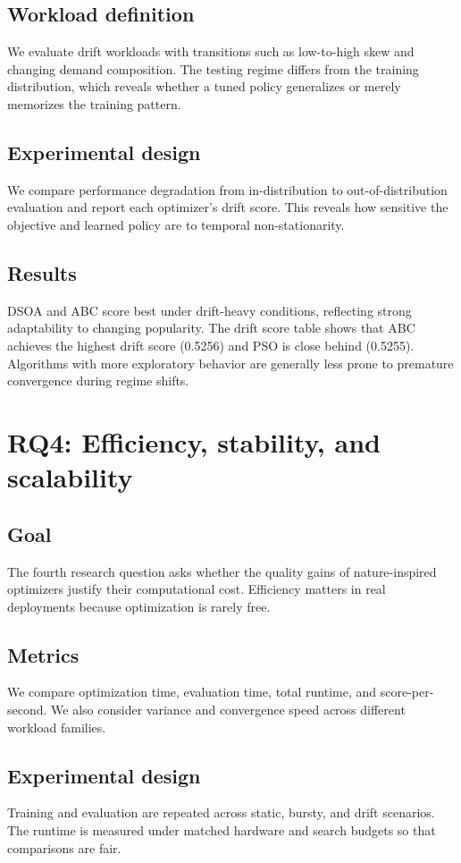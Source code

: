 \documentclass[10pt,journal,compsoc]{IEEEtran}
\begin{document}
\subsection{Workload definition}
We evaluate drift workloads with transitions such as low-to-high skew and changing demand composition. The testing regime differs from the training distribution, which reveals whether a tuned policy generalizes or merely memorizes the training pattern.

\subsection{Experimental design}
We compare performance degradation from in-distribution to out-of-distribution evaluation and report each optimizer's drift score. This reveals how sensitive the objective and learned policy are to temporal non-stationarity.

\subsection{Results}
DSOA and ABC score best under drift-heavy conditions, reflecting strong adaptability to changing popularity. The drift score table shows that ABC achieves the highest drift score (0.5256) and PSO is close behind (0.5255). Algorithms with more exploratory behavior are generally less prone to premature convergence during regime shifts.

\section{RQ4: Efficiency, stability, and scalability}
\subsection{Goal}
The fourth research question asks whether the quality gains of nature-inspired optimizers justify their computational cost. Efficiency matters in real deployments because optimization is rarely free.

\subsection{Metrics}
We compare optimization time, evaluation time, total runtime, and score-per-second. We also consider variance and convergence speed across different workload families.

\subsection{Experimental design}
Training and evaluation are repeated across static, bursty, and drift scenarios. The runtime is measured under matched hardware and search budgets so that comparisons are fair.
\end{document}
